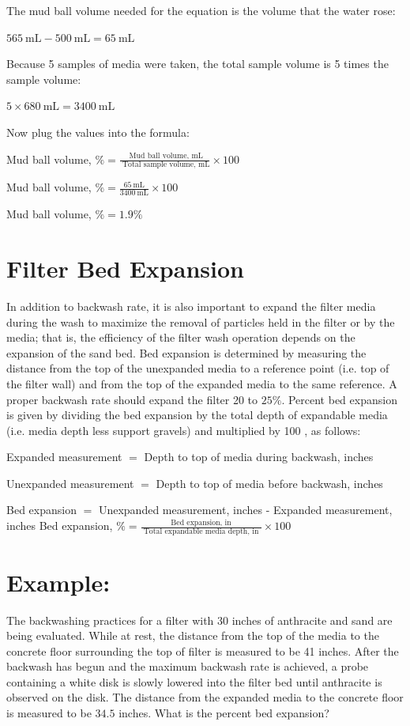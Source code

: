 \documentclass[10pt]{article}
\begin{document}
The mud ball volume needed for the equation is the volume that the water rose:

$565 \mathrm{~mL}-500 \mathrm{~mL}=65 \mathrm{~mL}$

Because 5 samples of media were taken, the total sample volume is 5 times the sample volume:

$5 \times 680 \mathrm{~mL}=3400 \mathrm{~mL}$

Now plug the values into the formula:

Mud ball volume, $\%=\frac{\text { Mud ball volume, } \mathrm{mL}}{\text { Total sample volume, } \mathrm{mL}} \times 100$

Mud ball volume, $\%=\frac{65 \mathrm{~mL}}{3400 \mathrm{~mL}} \times 100$

Mud ball volume, $\%=1.9 \%$

\section{Filter Bed Expansion}
In addition to backwash rate, it is also important to expand the filter media during the wash to maximize the removal of particles held in the filter or by the media; that is, the efficiency of the filter wash operation depends on the expansion of the sand bed. Bed expansion is determined by measuring the distance from the top of the unexpanded media to a reference point (i.e. top of the filter wall) and from the top of the expanded media to the same reference. A proper backwash rate should expand the filter 20 to $25 \%$. Percent bed expansion is given by dividing the bed expansion by the total depth of expandable media (i.e. media depth less support gravels) and multiplied by 100 , as follows:

Expanded measurement $=$ Depth to top of media during backwash, inches

Unexpanded measurement $=$ Depth to top of media before backwash, inches

Bed expansion $=$ Unexpanded measurement, inches - Expanded measurement, inches Bed expansion, $\%=\frac{\text { Bed expansion, in }}{\text { Total expandable media depth, in }} \times 100$

\section{Example:}
The backwashing practices for a filter with 30 inches of anthracite and sand are being evaluated. While at rest, the distance from the top of the media to the concrete floor surrounding the top of filter is measured to be 41 inches. After the backwash has begun and the maximum backwash rate is achieved, a probe containing a white disk is slowly lowered into the filter bed until anthracite is observed on the disk. The distance from the expanded media to the concrete floor is measured to be $34.5$ inches. What is the percent bed expansion?
\end{document}
